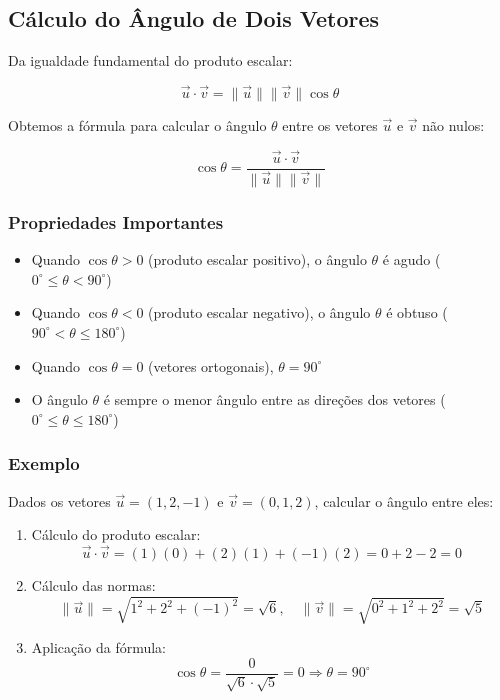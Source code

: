 \subsection{Cálculo do Ângulo de Dois Vetores}

Da igualdade fundamental do produto escalar:

\[
\vec{u} \cdot \vec{v} = \|\vec{u}\| \|\vec{v}\| \cos\theta
\]

Obtemos a fórmula para calcular o ângulo $\theta$ entre os vetores $\vec{u}$ e
$\vec{v}$ não nulos:

\begin{equation}
\cos\theta = \frac{\vec{u} \cdot \vec{v}}{\|\vec{u}\| \|\vec{v}\|}
\label{eq:angulo_vetores}
\end{equation}

\subsubsection*{Propriedades Importantes}

\begin{itemize}
    \item Quando $\cos\theta > 0$ (produto escalar positivo), o ângulo $\theta$ é agudo ($0^\circ \leq \theta < 90^\circ$)
    
    \item Quando $\cos\theta < 0$ (produto escalar negativo), o ângulo $\theta$ é obtuso ($90^\circ < \theta \leq 180^\circ$)
    
    \item Quando $\cos\theta = 0$ (vetores ortogonais), $\theta = 90^\circ$
    
    \item O ângulo $\theta$ é sempre o menor ângulo entre as direções dos vetores ($0^\circ \leq \theta \leq 180^\circ$)
\end{itemize}

\subsubsection*{Exemplo}

Dados os vetores $\vec{u} = (1, 2, -1)$ e $\vec{v} = (0, 1, 2)$, calcular o
ângulo entre eles:

\begin{enumerate}
  \item Cálculo do produto escalar:
  \[
  \vec{u} \cdot \vec{v} = (1)(0) + (2)(1) + (-1)(2) = 0 + 2 - 2 = 0
  \]
  
  \item Cálculo das normas:
  \[
  \|\vec{u}\| = \sqrt{1^2 + 2^2 + (-1)^2} = \sqrt{6}, \quad \|\vec{v}\| = \sqrt{0^2 + 1^2 + 2^2} = \sqrt{5}
  \]
  
  \item Aplicação da fórmula:
  \[
  \cos\theta = \frac{0}{\sqrt{6} \cdot \sqrt{5}} = 0 \Rightarrow \theta = 90^\circ
  \]
\end{enumerate}

